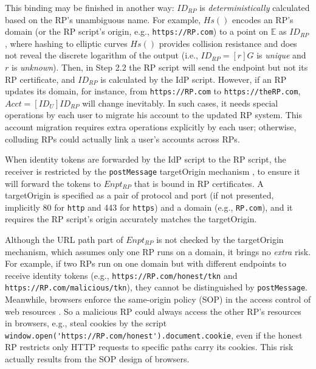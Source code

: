 This binding may be finished in another way:
    $ID_{RP}$ is \emph{deterministically} calculated based on the RP's unambiguous name.
For example, $Hs()$ encodes an RP's domain (or the RP script's origin, e.g., \verb+https://RP.com+) to
 a point on $\mathbb{E}$ as $ID_{RP}$,
where
    hashing to elliptic curves $Hs()$ \cite{irtf-cfrg-hash-to-curve-16} provides collision resistance
     and does not reveal the discrete logarithm of the output
    (i.e., $ID_{RP} = [r]G$ is \emph{unique} and $r$ is \emph{unknown}).
Then,  in Step 2.2 the RP script will send the endpoint but not its RP certificate,
 and $ID_{RP}$ is calculated by the IdP script.
However, if an RP updates its domain, for instance, from \verb+https://RP.com+ to \verb+https://theRP.com+,
$Acct = [ID_U]ID_{RP}$ will change inevitably.
In such cases,
    it needs special operations by each user to migrate his account
            to the updated RP system.
This account migration requires extra operations explicitly by each user;
    otherwise,
        colluding RPs could actually link a user's accounts across RPs.


\vspace{0.75mm}
When identity tokens are forwarded by the IdP script to the RP script, %
    the receiver is restricted by the \verb+postMessage+ targetOrigin mechanism \cite{postm-targeto},
        to ensure it will forward the tokens to $Enpt_{RP}$
        that is bound in RP certificates.
A targetOrigin is specified as
a pair of protocol and port (if not presented, implicitly 80 for \verb+http+ and 443 for \verb+https+)
    and a domain (e.g., \verb+RP.com+),
        and it requires the RP script's origin accurately matches the targetOrigin.

Although the URL path part of $Enpt_{RP}$ %
 is not checked by the targetOrigin mechanism,
  which assumes only one RP runs on a domain,
   it brings no \emph{extra} risk.
For example, if two RPs run on one domain but with different endpoints to receive identity tokens
        (e.g., \verb+https://RP.com/honest/tkn+ and \verb+https://RP.com/malicious/tkn+),
         they cannot be distinguished by \verb+postMessage+.
Meanwhile, browsers enforce
 the same-origin policy (SOP) in the access control of web resources \cite{sop}.
So
    a malicious RP could always access the other RP's resources in browsers,
        e.g., steal cookies
        by the script
        \verb+window.open('https://RP.com/honest').document.cookie+,
    even if the honest RP restricts only HTTP requests to specific paths carry its cookies.
This risk actually results from the SOP design of browsers.



